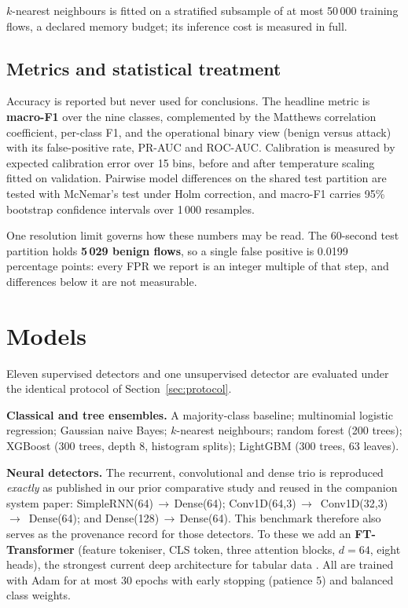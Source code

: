 \documentclass[review,12pt]{elsarticle}
\begin{document}
$k$-nearest neighbours is fitted on a stratified subsample of at most 50\,000 training
flows, a declared memory budget; its inference cost is measured in full.

\subsection{Metrics and statistical treatment}
Accuracy is reported but never used for conclusions. The headline metric is
\textbf{macro-F1} over the nine classes, complemented by the Matthews correlation
coefficient, per-class F1, and the operational binary view (benign versus attack) with
its false-positive rate, PR-AUC and ROC-AUC. Calibration is measured by expected
calibration error over 15 bins, before and after temperature scaling fitted on
validation. Pairwise model differences on the shared test partition are tested with
McNemar's test under Holm correction, and macro-F1 carries 95\% bootstrap confidence
intervals over 1\,000 resamples.

One resolution limit governs how these numbers may be read. The 60-second test partition
holds \textbf{5\,029 benign flows}, so a single false positive is 0.0199 percentage
points: every FPR we report is an integer multiple of that step, and differences below it
are not measurable.

\section{Models}
\label{sec:models}

Eleven supervised detectors and one unsupervised detector are evaluated under the
identical protocol of Section~\ref{sec:protocol}.

\textbf{Classical and tree ensembles.} A majority-class baseline; multinomial logistic
regression; Gaussian naive Bayes; $k$-nearest neighbours; random forest (200 trees);
XGBoost (300 trees, depth 8, histogram splits); LightGBM (300 trees, 63 leaves).

\textbf{Neural detectors.} The recurrent, convolutional and dense trio is reproduced
\emph{exactly} as published in our prior comparative study \cite{bahri2023comparative}
and reused in the companion system paper:
SimpleRNN(64)\,$\to$\,Dense(64);\allowbreak{} Conv1D(64,3)\,$\to$\,\allowbreak{}
Conv1D(32,3)\,$\to$\,\allowbreak{} Dense(64);\allowbreak{} and
Dense(128)\,$\to$\,Dense(64). This benchmark therefore also serves as
the provenance record for those detectors. To these we add an \textbf{FT-Transformer}
(feature tokeniser, CLS token, three attention blocks, $d=64$, eight heads), the strongest
current deep architecture for tabular data \cite{gorishniy2021ftt}. All are trained with
Adam for at most 30 epochs with early stopping (patience 5) and balanced class weights.
\end{document}
